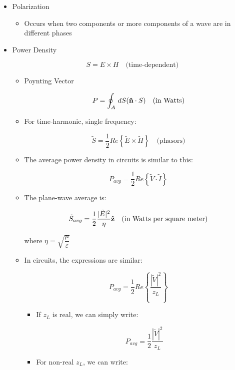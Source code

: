\begin{itemize}
  \item Polarization

    \begin{itemize}

      \item Occurs when two components or more components of a wave are in different phases

    \end{itemize}

  \item Power Density

    $$S=E\times H\quad\text{(time-dependent)}$$

    \begin{itemize}

      \item Poynting Vector

        $$P=\oint_A\,dS(\bold{\hat{n}}\cdot S)\quad\text{(in Watts)}$$

      \item For time-harmonic, single frequency:

        $$\tilde{S}=\frac{1}{2}Re\left\{\tilde{E}\times \tilde{H}\right\}\quad\text{(phasors)}$$

      \item The average power density in circuits is similar to this:

        $$P_{avg}=\frac{1}{2}Re\left\{ \tilde{V}\cdot\tilde{I} \right\}$$

      \item The plane-wave average is:

        $$\tilde{S}_{avg}=\frac{1}{2}\frac{|\tilde{E}|^2}{\eta}\bold{\hat{z}}\quad\text{(in Watts per square meter)}$$

        where $\eta=\sqrt{\dfrac{\mu}{\varepsilon}}$

      \item In circuits, the expressions are similar:

        $$P_{avg}=\frac{1}{2}Re\left\{ \frac{|\tilde{V}|^2}{z_L} \right\}$$

        \begin{itemize}

          \item If $z_L$ is real, we can simply write:

            $$P_{avg}=\frac{1}{2}\frac{|\tilde{V}|^2}{z_L}$$

          \item For non-real $z_L$, we can write:


\end{itemize}
\end{itemize}
\end{itemize}
